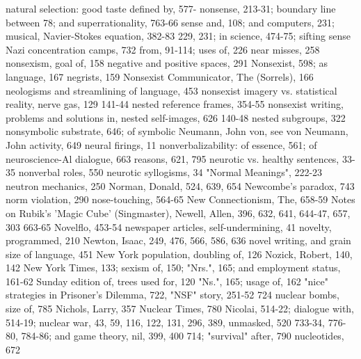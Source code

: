 natural selection: good taste defined by, 577-   nonsense, 213-31; boundary line between
 78; and superrationality, 763-66                 sense and, 108; and computers, 231; musical,
Navier-Stokes equation, 382-83                    229, 231; in science, 474-75; sifting sense
Nazi concentration camps, 732                     from, 91-114; uses of, 226
near misses, 258                                 nonsexism, goal of, 158
negative and positive spaces, 291                Nonsexist, 598; as language, 167
negrists, 159                                    Nonsexist Communicator, The (Sorrels), 166
neologisms and streamlining of language, 453     nonsexist imagery vs. statistical reality,
nerve gas, 129                                   141-44
nested reference frames, 354-55                  nonsexist writing, problems and solutions in,
nested self-images, 626                           140-48
nested subgroups, 322                            nonsymbolic substrate, 646; of symbolic
Neumann, John von, see von Neumann, John          activity, 649
neural firings, 11                               nonverbalizability: of essence, 561; of
neuroscience-Al dialogue, 663                     reasons, 621, 795
neurotic vs. healthy sentences, 33-35            nonverbal roles, 550
neurotic syllogisms, 34                          "Normal Meanings", 222-23
neutron mechanics, 250                           Norman, Donald, 524, 639, 654
Newcombe's paradox, 743                          norm violation, 290 nose-touching, 564-65
New Connectionism, The, 658-59                   Notes on Rubik's 'Magic Cube' (Singmaster),
Newell, Allen, 396, 632, 641, 644-47, 657,        303
 663-65                                          Novelflo, 453-54
newspaper articles, self-undermining, 41         novelty, programmed, 210
Newton, Isaac, 249, 476, 566, 586, 636           novel writing, and grain size of language, 451
New York population, doubling of, 126            Nozick, Robert, 140, 142
New York Times, 133; sexism of, 150;             "Nrs.", 165; and employment status, 161-62
 Sunday edition of, trees used for, 120          "Ns.", 165; usage of, 162
"nice" strategies in Prisoner's Dilemma, 722,    "NSF" story, 251-52
 724                                             nuclear bombs, size of, 785
Nichols, Larry, 357                              Nuclear Times, 780
Nicolai, 514-22; dialogue with, 514-19;          nuclear war, 43, 59, 116, 122, 131, 296, 389,
 unmasked, 520                                    733-34, 776-80, 784-86; and game theory,
nil, 399, 400                                     714; "survival" after, 790 nucleotides, 672
